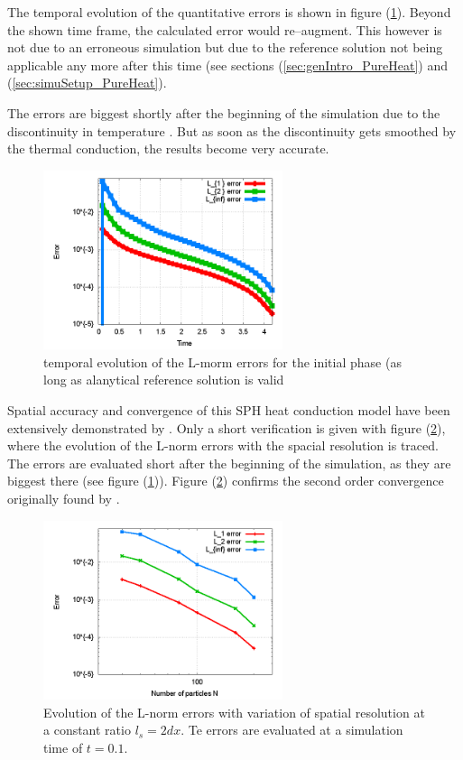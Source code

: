 \documentclass{report}
\begin{document}
The temporal evolution of the quantitative errors is shown in figure (\ref{fig:PureHeat_temporalErrorEvolution}). Beyond the shown time frame, the calculated error would re--augment. This however is not due to an erroneous simulation but due to the reference solution not being applicable any more after this time (see sections (\ref{sec:genIntro_PureHeat}) and (\ref{sec:simuSetup_PureHeat}). 

The errors are biggest shortly after the beginning of the simulation due to the discontinuity in temperature \cite{Cleary1999}. But as soon as the discontinuity gets smoothed by the thermal conduction, the results become very accurate.

\begin{figure}[h]  
  \label{fig:PureHeat_temporalErrorEvolution}
  \centering
  \includegraphics[width=7cm]{Graphics/results/PureHeatConduction/temporalErrEvolution}
  \caption{temporal evolution of the L-morm errors for the initial phase (as long as alanytical reference solution is valid}
\end{figure}


Spatial accuracy and convergence of this SPH heat conduction model have been extensively demonstrated by \cite{Cleary1999}. Only a short verification is given with figure (\ref{fig:PureHeat_ErrorResolution}), where the evolution of the L-norm errors with the spacial resolution is traced. The errors are evaluated short after the beginning of the simulation, as they are biggest there (see figure (\ref{fig:PureHeat_temporalErrorEvolution})). Figure (\ref{fig:PureHeat_ErrorResolution}) confirms the second order convergence originally found by \cite{Cleary1999}.

\begin{figure}[h]  
  \label{fig:PureHeat_ErrorResolution}
  \centering
  \includegraphics[width=7cm]{Graphics/results/PureHeatConduction/ErrorResolution}
  \caption{Evolution of the L-norm errors with variation of spatial resolution at a constant ratio $l_s=2dx$. Te errors are evaluated at a simulation time of $t=0.1$.}
\end{figure}
\end{document}
